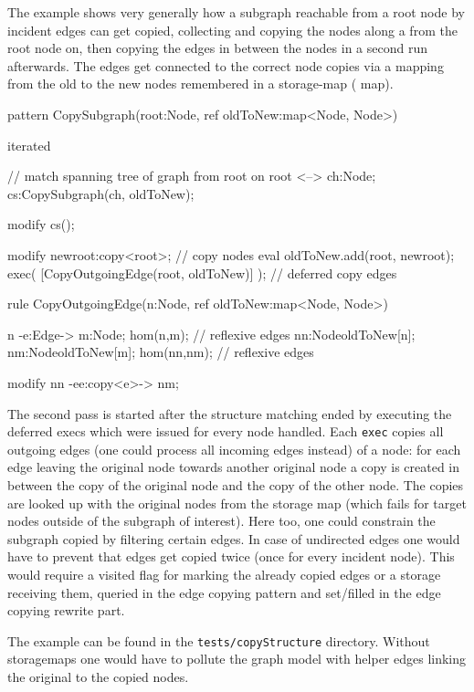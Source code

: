   \begin{example}
The example shows very generally how a subgraph reachable from a root node by incident edges can get copied, collecting and copying the nodes along a  from the root node on, then copying the edges in between the nodes in a second run afterwards. The edges get connected to the correct node copies via a mapping from the old to the new nodes remembered in a storage-map ( map).
    \begin{grgen}
pattern CopySubgraph(root:Node, ref oldToNew:map<Node, Node>)
{
  iterated { // match spanning tree of graph from root on
    root <--> ch:Node;
    cs:CopySubgraph(ch, oldToNew);

    modify {
      cs();
    }
  }

  modify {
    newroot:copy<root>; // copy nodes
    eval { oldToNew.add(root, newroot); }
    exec( [CopyOutgoingEdge(root, oldToNew)] ); // deferred copy edges
  }
}

rule CopyOutgoingEdge(n:Node, ref oldToNew:map<Node, Node>)
{
  n -e:Edge-> m:Node;
  hom(n,m); // reflexive edges
  nn:Node{oldToNew[n]}; nm:Node{oldToNew[m]};
  hom(nn,nm); // reflexive edges

  modify {
    nn -ee:copy<e>-> nm;
  }
}
    \end{grgen}
  \end{example}

The second pass is started after the structure matching ended by executing the deferred execs which were issued for every node handled.
Each \texttt{exec} copies all outgoing edges (one could process all incoming edges instead) of a node:
for each edge leaving the original node towards another original node a copy is created in between the copy of the original node and the copy of the other node.
The copies are looked up with the original nodes from the storage map (which fails for target nodes outside of the subgraph of interest).
Here too, one could constrain the subgraph copied by filtering certain edges.
In case of undirected edges one would have to prevent that edges get copied twice (once for every incident node). This would require a visited flag for marking the already copied edges or a storage receiving them, queried in the edge copying pattern and set/filled in the edge copying rewrite part.

The example can be found in the \texttt{tests/copyStructure} directory.
Without storagemaps one would have to pollute the graph model with helper edges linking the original to the copied nodes.

